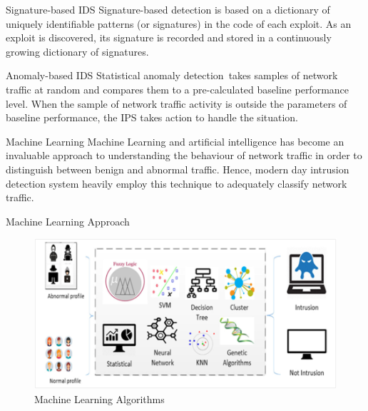 \documentclass[pdf]
{beamer}
\begin{document}
\begin{frame}{Signature-based IDS}
    Signature-based detection is based on a dictionary of uniquely identifiable patterns (or signatures) in the code of each exploit. As an exploit is discovered, its signature is recorded and stored in a continuously growing dictionary of signatures. 

\end{frame}

\begin{frame}{Anomaly-based IDS}
    Statistical anomaly detection takes samples of network traffic at random and compares them to a pre-calculated baseline performance level. When the sample of network traffic activity is outside the parameters of baseline performance, the IPS takes action to handle the situation.
    
\end{frame}

\begin{frame}{Machine Learning}
    Machine Learning and artificial intelligence has become an invaluable approach to understanding the behaviour of network traffic in order to distinguish between benign and abnormal traffic. Hence, modern day intrusion detection system heavily employ this technique to adequately classify network traffic. 

\end{frame}

\begin{frame}{Machine Learning Approach}
   \begin{figure}[h!]
        \centering
        \includegraphics[scale=0.5]{ML_Algorithm.png}
        \caption{Machine Learning Algorithms}
        \label{fig:ML_Algorithm}
    \end{figure}

\end{frame}
\end{document}
